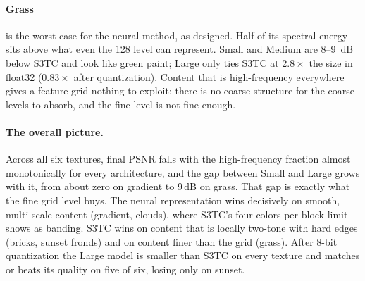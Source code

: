 \documentclass[11pt]{article}
\newcommand{\dB}{\,\mathrm{dB}}
\begin{document}
\paragraph{Grass} is the worst case for the neural method, as designed. Half of its spectral energy sits above what even the 128 level can represent. Small and Medium are 8--9~dB below S3TC and look like green paint; Large only ties S3TC at $2.8\times$ the size in float32 ($0.83\times$ after quantization). Content that is high-frequency everywhere gives a feature grid nothing to exploit: there is no coarse structure for the coarse levels to absorb, and the fine level is not fine enough.

\paragraph{The overall picture.} Across all six textures, final PSNR falls with the high-frequency fraction almost monotonically for every architecture, and the gap between Small and Large grows with it, from about zero on gradient to $9\dB$ on grass. That gap is exactly what the fine grid level buys. The neural representation wins decisively on smooth, multi-scale content (gradient, clouds), where S3TC's four-colors-per-block limit shows as banding. S3TC wins on content that is locally two-tone with hard edges (bricks, sunset fronds) and on content finer than the grid (grass). After 8-bit quantization the Large model is smaller than S3TC on every texture and matches or beats its quality on five of six, losing only on sunset.
\end{document}
